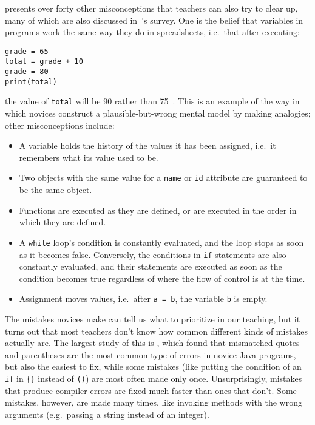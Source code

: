 \cite{Sorv2018} presents over forty other misconceptions that teachers can also try to clear up,
many of which are also discussed in~\cite{Qian2017}'s survey.
One is the belief that variables in programs work the same way they do in spreadsheets,
i.e.\ that after executing:

\begin{verbatim}
grade = 65
total = grade + 10
grade = 80
print(total)
\end{verbatim}

\noindent
the value of \texttt{total} will be 90 rather than 75~\cite{Kohn2017}.
This is an example of the way in which novices construct a plausible-but-wrong mental model by making analogies;
other misconceptions include:

\begin{itemize}

\item
  A variable holds the history of the values it has been assigned,
  i.e.\ it remembers what its value used to be.

\item
  Two objects with the same value for a \texttt{name} or \texttt{id} attribute
  are guaranteed to be the same object.

\item
  Functions are executed as they are defined,
  or are executed in the order in which they are defined.

\item
  A \texttt{while} loop's condition is constantly evaluated,
  and the loop stops as soon as it becomes false.
  Conversely,
  the conditions in \texttt{if} statements are also constantly evaluated,
  and their statements are executed as soon as the condition becomes true
  regardless of where the flow of control is at the time.

\item
  Assignment moves values,
  i.e.\ after \texttt{a\ =\ b}, the variable \texttt{b} is empty.

\end{itemize}


The mistakes novices make can tell us what to prioritize in our teaching,
but it turns out that most teachers don't know how common different kinds of mistakes actually are.
The largest study of this is \cite{Brow2017},
which found that mismatched quotes and parentheses are the most common type of errors in novice Java programs,
but also the easiest to fix,
while some mistakes (like putting the condition of an \texttt{if} in \texttt{\{\}} instead of \texttt{()})
are most often made only once.
Unsurprisingly,
mistakes that produce compiler errors are fixed much faster than ones that don't.
Some mistakes,
however,
are made many times,
like invoking methods with the wrong arguments
(e.g.\ passing a string instead of an integer).

